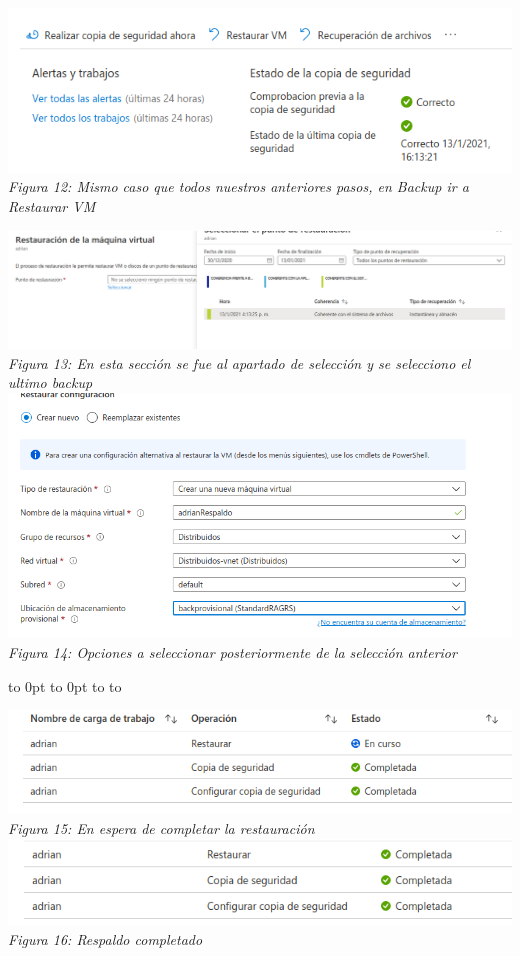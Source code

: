 \documentclass[10pt,executivepaper]{article}
\def\fillandplacepagenumber{%
 \par\pagestyle{empty}%
 \vbox to 0pt{\vss}\vfill
 \vbox to 0pt{\baselineskip0pt
   \hbox to\linewidth{\hss}%
   \baselineskip\footskip
   \hbox to\linewidth{%
     \hfil\thepage\hfil}\vss}}
\begin{document}
\begin{center}
  \includegraphics[scale=0.5]{imgs/10.png}\\
  \textit{Figura 12: Mismo caso que todos nuestros anteriores pasos, en Backup ir a Restaurar VM}\\
  \begin{landscape}
    \includegraphics[scale=0.45]{imgs/11.png}\\
    \textit{Figura 13: En esta sección se fue al apartado de selección y se selecciono el ultimo backup}\\
    \includegraphics[scale=0.5]{imgs/12.png}\\
    \textit{Figura 14: Opciones a seleccionar posteriormente de la selección anterior}
    \fillandplacepagenumber
  \end{landscape}
  \includegraphics[scale=0.5]{imgs/13.png}\\
  \textit{Figura 15: En espera de completar la restauración}\\
  \includegraphics[scale=0.5]{imgs/14.png}\\
  \textit{Figura 16: Respaldo completado}
\end{center}
\end{document}
